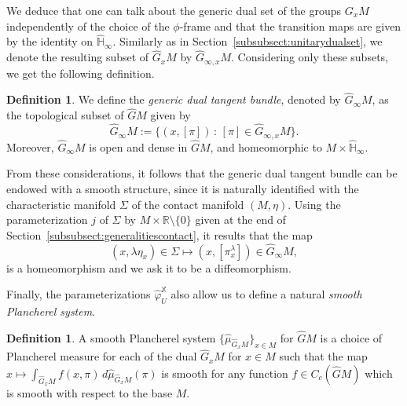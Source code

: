 \documentclass[12pt,a4paper]{amsart}
\theoremstyle{plain}
\theoremstyle{definition}
\newtheorem{definition}[theorem]{Definition}
\theoremstyle{remark}
\numberwithin{equation}{section}
\theoremstyle{definition}
\def\R{{\mathbb R}}%
\def \bX{\mathbb{X}}
\def \Heis{\mathbb{H}}
\def \Ghat{\widehat{G}}
\def \Hhat{\widehat{\Heis}}
\numberwithin{equation}{section}
\begin{document}
We deduce that one can talk about the generic dual set of the groups $G_x M$ independently of the choice of the $\phi$-frame and that the transition maps are given by the identity on $\Hhat_\infty$. Similarly as in Section~\ref{subsubsect:unitarydualset}, we denote the resulting subset of $\Ghat_x M$ by $\Ghat_{\infty,x} M$. Considering only these subsets, we get the following definition.

\begin{definition}
    We define the \emph{generic dual tangent bundle}, denoted by $\Ghat_\infty M$, as the topological subset of $\Ghat M$ given by 
    \begin{equation*}
        \Ghat_\infty M := \{(x,[\pi])\,:\,[\pi]\in \Ghat_{\infty,x} M\}.
    \end{equation*}
    Moreover, $\Ghat_\infty M$ is open and dense in $\Ghat M$, and homeomorphic to $M\times \Hhat_\infty$.
\end{definition}


From these considerations, it follows that the generic dual tangent bundle can be endowed with a smooth structure, since it is naturally identified with the characteristic manifold $\Sigma$ of the contact manifold $(M,\eta)$. Using the parameterization $j$ of $\Sigma$ by $M\times\R\setminus\{0\}$ given at the end of Section~\ref{subsubsect:generalitiescontact}, it results that the map
\begin{equation}
    \label{eq:sigmagenericdual}
    (x,\lambda\eta_x)\in \Sigma \mapsto (x,[\pi_{x}^\lambda])\in \Ghat_\infty M,
\end{equation}
is a homeomorphism and we ask it to be a diffeomorphism.

\vspace{0.25cm}

Finally, the parameterizations $\hat{\varphi}_U^{\bX}$ also allow us to define a natural \emph{smooth Plancherel system}. 

\begin{definition}
    \label{def:smoothPlancherel}
    A smooth Plancherel system $\{\hat{\mu}_{\Ghat_x M}\}_{x\in M}$ for $\Ghat M$ is a choice of Plancherel measure for each of the dual $\Ghat_x M$ for $x\in M$ such that the map $x\mapsto \int_{\Ghat_x M} f(x,\pi)\,d\hat{\mu}_{\Ghat_x M}(\pi)$ is smooth for any function $f\in C_c(\Ghat M)$ which is smooth with respect to the base $M$.
\end{definition}
\end{document}
